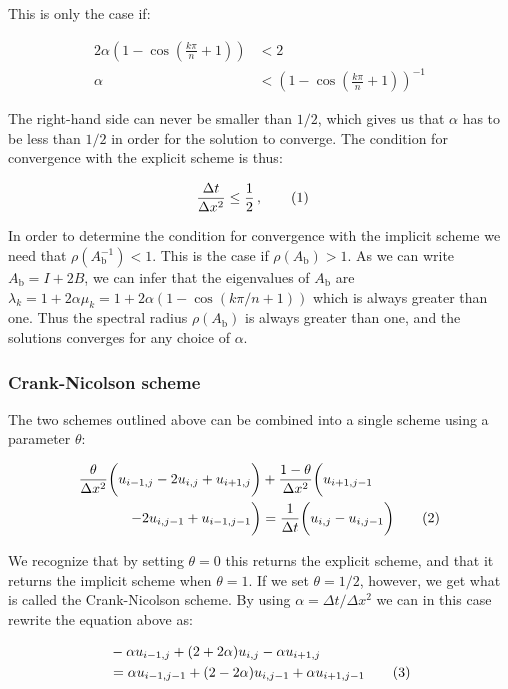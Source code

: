 \documentclass[reprint,english,notitlepage]{revtex4-1}  %
\newcommand\numberthis{\addtocounter{equation}{1}\tag{\theequation}}
\begin{document}
This is only the case if:

\begin{align*}
2\alpha ( 1 - \cos( \frac{k\pi}{n} + 1) ) &< 2 \\
\alpha &< ( 1 - \cos( \frac{k\pi}{n} + 1) )^{-1} 
\end{align*}

The right-hand side can never be smaller than $1/2$, which gives us that $\alpha$ has to be less than $1/2$ in order for the solution to converge. The condition for convergence with the explicit scheme is thus:

\begin{align*}
\frac{\Delta t}{\Delta x^2} &\leq \frac{1}{2} \, , \numberthis \label{eq:forward_euler_convergence}
\end{align*}

In order to determine the condition for convergence with the implicit scheme we need that $\rho(A_\text{b}^{-1}) < 1$. This is the case if $\rho(A_\text{b}) > 1$. As we can write $A_\text{b} = I + 2B$, we can infer that the eigenvalues of $A_\text{b}$ are $\lambda_k = 1 + 2\alpha \mu_k = 1 + 2\alpha (1 - \cos(k\pi/n + 1) )$ which is always greater than one. Thus the spectral radius $\rho(A_\text{b})$ is always greater than one, and the solutions converges for any choice of $\alpha$. 


\subsubsection{Crank-Nicolson scheme} \label{sec:formalism_crank_nicolson}

The two schemes outlined above can be combined into a single scheme using a parameter $\theta$:

\begin{align*}
\frac{\theta}{\Delta x^2} \bigg( u_{i-1,j} - 2u_{i,j} + u_{i+1,j} \bigg) &+ \frac{1 - \theta}{\Delta x^2} \bigg( u_{i+1,j-1} \\
- 2u_{i,j-1} + u_{i-1,j-1} \bigg) &= \frac{1}{\Delta t} \bigg( u_{i,j} - u_{i,j-1} \bigg) \numberthis \label{eq:theta_rule}
\end{align*}

We recognize that by setting $\theta=0$ this returns the explicit scheme, and that it returns the implicit scheme when $\theta = 1$. If we set $\theta = 1/2$, however, we get what is called the Crank-Nicolson scheme. By using $\alpha = \Delta t / \Delta x^2$ we can in this case rewrite the equation above as:

\begin{align*}
&-\alpha u_{i-1,j} + (2 + 2 \alpha) u_{i,j} - \alpha u_{i+1,j} \\
&= \alpha u_{i-1,j-1} + (2-2\alpha) u_{i,j-1} + \alpha u_{i+1,j-1} \numberthis \label{eq:crank_nicolson}
\end{align*}
\end{document}
